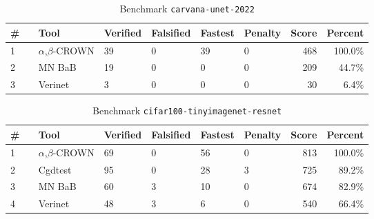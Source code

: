 

\begin{table}[h]
\begin{center}
\caption{Benchmark \texttt{carvana-unet-2022}} \label{tab:cat_{cat}}
{\setlength{\tabcolsep}{2pt}
\begin{tabular}[h]{@{}llllllrr@{}}
\toprule
\textbf{\# ~} & \textbf{Tool} & \textbf{Verified} & \textbf{Falsified} & \textbf{Fastest} & \textbf{Penalty} & \textbf{Score} & \textbf{Percent}\\
\midrule
1 & $\alpha$,$\beta$-CROWN & 39 & 0 & 39 & 0 & 468 & 100.0\% \\
2 & MN BaB & 19 & 0 & 0 & 0 & 209 & 44.7\% \\
3 & Verinet & 3 & 0 & 0 & 0 & 30 & 6.4\% \\
\bottomrule
\end{tabular}
}
\end{center}
\end{table}




\begin{table}[h]
\begin{center}
\caption{Benchmark \texttt{cifar100-tinyimagenet-resnet}} \label{tab:cat_{cat}}
{\setlength{\tabcolsep}{2pt}
\begin{tabular}[h]{@{}llllllrr@{}}
\toprule
\textbf{\# ~} & \textbf{Tool} & \textbf{Verified} & \textbf{Falsified} & \textbf{Fastest} & \textbf{Penalty} & \textbf{Score} & \textbf{Percent}\\
\midrule
1 & $\alpha$,$\beta$-CROWN & 69 & 0 & 56 & 0 & 813 & 100.0\% \\
2 & Cgdtest & 95 & 0 & 28 & 3 & 725 & 89.2\% \\
3 & MN BaB & 60 & 3 & 10 & 0 & 674 & 82.9\% \\
4 & Verinet & 48 & 3 & 6 & 0 & 540 & 66.4\% \\
\bottomrule
\end{tabular}
}
\end{center}
\end{table}




